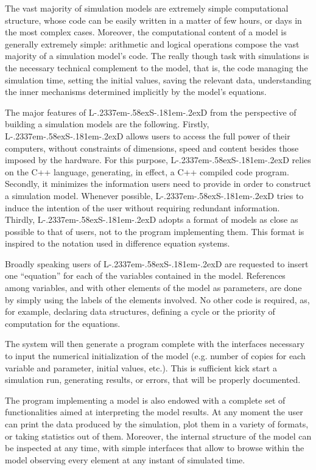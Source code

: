 \documentclass [11pt,a4paper] {book}
\def\LsD{{L\kern-.2337em\lower-.58ex\hbox{S}\kern-.181em\lower-.2ex\hbox{D}}\xspace}
\begin{document}
The vast majority of simulation models are extremely simple computational structure, whose code can be easily written in a matter of few hours, or days in the most complex cases. Moreover, the computational content of a model is generally extremely simple: arithmetic and logical operations compose the vast majority of a simulation model's code. The really though task with simulations is the necessary technical complement to the model, that is, the code managing the simulation time, setting the initial values, saving the relevant data, understanding the inner mechanisms determined implicitly by the model's equations.

The major features of \LsD from the perspective of building a simulation models are the following. Firstly, \LsD allows users to access the full power of their computers, without constraints of dimensions, speed and content besides those imposed by the hardware. For this purpose, \LsD relies on the C++ language, generating, in effect, a C++ compiled code program. Secondly, it minimizes the information users need to provide in order to construct a simulation model. Whenever possible, \LsD tries to induce the intention of the user without requiring redundant information. Thirdly, \LsD adopts a format of models as close as possible to that of users, not to the program implementing them. This format is inspired to the notation used in difference equation systems.

Broadly speaking users of \LsD are requested to insert one ``equation'' for each of the variables contained in the model. References among variables, and with other elements of the model as parameters, are done by simply using the labels of the elements involved. No other code is required, as, for example, declaring data structures, defining a cycle or the priority of computation for the equations.

The system will then generate a program complete with the interfaces necessary to input the numerical initialization of the model (e.g. number of copies for each variable and parameter, initial values, etc.). This is sufficient kick start a simulation run, generating results, or errors, that will be properly documented.

The program implementing a model is also endowed with a complete set of functionalities aimed at interpreting the model results. At any moment the user can print the data produced by the simulation, plot them in a variety of formats, or taking statistics out of them. Moreover, the internal structure of the model can be inspected at any time, with simple interfaces that allow to browse within the model observing every element at any instant of simulated time.
\end{document}
